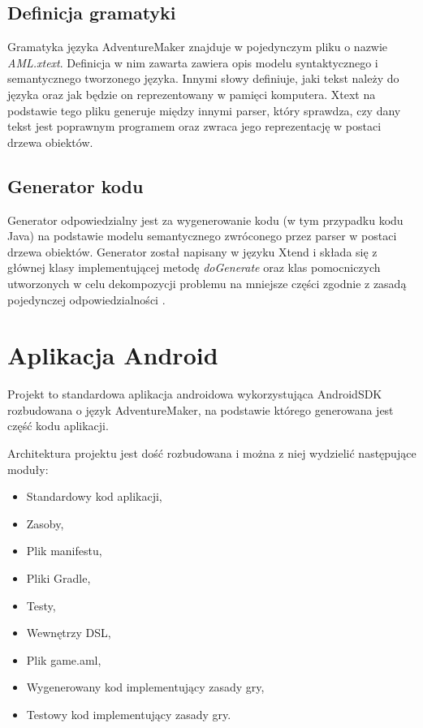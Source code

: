 \documentclass[openright]{xmgr}
\begin{document}
\subsection{Definicja gramatyki} 

Gramatyka języka AdventureMaker znajduje w pojedynczym pliku o nazwie \textit{AML.xtext}. Definicja w nim zawarta zawiera opis modelu syntaktycznego i semantycznego tworzonego języka. Innymi słowy definiuje, jaki tekst należy do języka oraz jak będzie on reprezentowany w pamięci komputera. Xtext na podstawie tego pliku generuje między innymi parser, który sprawdza, czy dany tekst jest poprawnym programem oraz zwraca jego reprezentację w postaci drzewa obiektów.

\subsection{Generator kodu}
Generator odpowiedzialny jest za wygenerowanie kodu (w tym przypadku kodu Java) na podstawie modelu semantycznego zwróconego przez parser w postaci drzewa obiektów. Generator został napisany w języku Xtend i składa się z głównej klasy implementującej metodę \textit{doGenerate} oraz klas pomocniczych utworzonych w celu dekompozycji problemu na mniejsze części zgodnie z zasadą pojedynczej odpowiedzialności \cite{CleanCode:2005}.

\section{Aplikacja Android}
Projekt to standardowa aplikacja androidowa wykorzystująca AndroidSDK rozbudowana o język AdventureMaker, na podstawie którego generowana jest część kodu aplikacji.

Architektura projektu jest dość rozbudowana i można z niej wydzielić następujące moduły:

\begin{itemize}
	\item Standardowy kod aplikacji,
	\item Zasoby,
	\item Plik manifestu,
	\item Pliki Gradle,
	\item Testy,
	\item Wewnętrzy DSL,
	\item Plik game.aml,
	\item Wygenerowany kod implementujący zasady gry,
	\item Testowy kod implementujący zasady gry.
\end{itemize}
\end{document}
